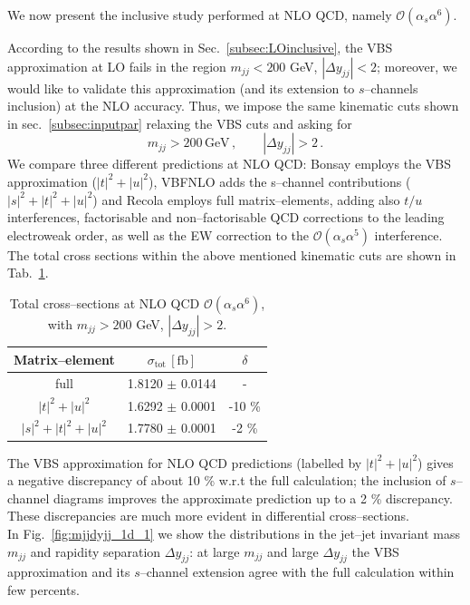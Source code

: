 We now present the inclusive study performed at NLO QCD, namely $\mathcal{O}(\alpha_s\alpha^6)$.

According to the results shown in Sec.~\ref{subsec:LOinclusive}, the VBS approximation at LO fails in the region $m_{jj} < 200$ GeV, $|\Delta y_{jj}| < 2$; moreover, we would like to validate this approximation (and its extension to $s$--channels inclusion) at the NLO accuracy.
Thus, we impose the same kinematic cuts shown in sec.~\ref{subsec:inputpar} relaxing the VBS cuts and asking for
\begin{equation}
	m_{jj} > 200 \,\textrm{GeV}\,,\qquad |\Delta y_{jj}| > 2\,.
\end{equation}
We compare three different predictions at NLO QCD: {\sc Bonsay} employs the VBS approximation ($|t|^2+|u|^2$), {\sc VBFNLO} adds the s--channel contributions ($|s|^2+|t|^2+|u|^2$) and {\sc Recola} employs full matrix--elements, adding also $t/u$ interferences, factorisable and non--factorisable QCD corrections to the leading electroweak order, as well as the EW correction to the $\mathcal{O}(\alpha_s\alpha^5)$ interference.
The total cross sections within the above mentioned kinematic cuts are shown in Tab.~\ref{tab:crosssecINCLUSIVE}.
\begin{table}[h!]
\centering
\begin{tabular}{c|c|c}
\bf Matrix--element & $\sigma_{\textrm{tot}}\,[\textrm{fb}]$ & $\delta$ \\
\hline
\hline
full &  1.8120 $\pm$ 0.0144 & - \\
\hline
$|t|^2 + |u|^2$ & 1.6292 $\pm$ 0.0001  &  -10 \% \\
\hline
$|s|^2 + |t|^2 + |u|^2$ & 1.7780 $\pm$ 0.0001  & -2 \%
\end{tabular}
\caption{\label{tab:crosssecINCLUSIVE}Total cross--sections at NLO QCD $\mathcal{O}(\alpha_s\alpha^6)$, with $m_{jj}>200$ GeV, $|\Delta y_{jj}|>2$.}
\end{table}
The VBS approximation for NLO QCD predictions (labelled by $|t|^2 + |u|^2$) gives a negative discrepancy of about 10 \% w.r.t the full calculation; the inclusion of $s$--channel diagrams improves the approximate prediction up to a 2 \% discrepancy.\\
These discrepancies are much more evident in differential cross--sections.\\
In Fig.~\ref{fig:mjjdyjj_1d_1} we show the distributions in the jet--jet invariant mass $m_{jj}$ and rapidity separation $\Delta y_{jj}$: at large $m_{jj}$ and large $\Delta y_{jj}$ the VBS approximation and its $s$--channel extension agree with the full calculation within few percents.
